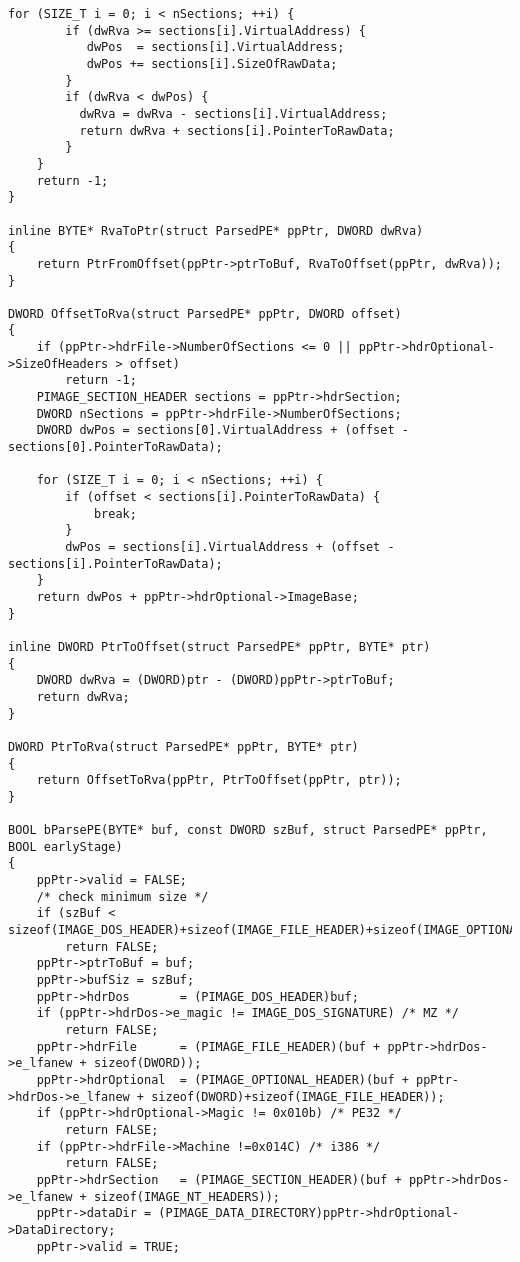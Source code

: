 \documentclass{article}
\begin{document}
\begin{lstlisting}[frame=single]
    for (SIZE_T i = 0; i < nSections; ++i) {
        if (dwRva >= sections[i].VirtualAddress) {
           dwPos  = sections[i].VirtualAddress;
           dwPos += sections[i].SizeOfRawData;
        }
        if (dwRva < dwPos) {
          dwRva = dwRva - sections[i].VirtualAddress;
          return dwRva + sections[i].PointerToRawData;
        }
    }
    return -1;
}

inline BYTE* RvaToPtr(struct ParsedPE* ppPtr, DWORD dwRva)
{
    return PtrFromOffset(ppPtr->ptrToBuf, RvaToOffset(ppPtr, dwRva));
}

DWORD OffsetToRva(struct ParsedPE* ppPtr, DWORD offset)
{
    if (ppPtr->hdrFile->NumberOfSections <= 0 || ppPtr->hdrOptional->SizeOfHeaders > offset)
        return -1;
    PIMAGE_SECTION_HEADER sections = ppPtr->hdrSection;
    DWORD nSections = ppPtr->hdrFile->NumberOfSections;
    DWORD dwPos = sections[0].VirtualAddress + (offset - sections[0].PointerToRawData);

    for (SIZE_T i = 0; i < nSections; ++i) {
        if (offset < sections[i].PointerToRawData) {
            break;
        }
        dwPos = sections[i].VirtualAddress + (offset - sections[i].PointerToRawData);
    }
    return dwPos + ppPtr->hdrOptional->ImageBase;
}

inline DWORD PtrToOffset(struct ParsedPE* ppPtr, BYTE* ptr)
{
    DWORD dwRva = (DWORD)ptr - (DWORD)ppPtr->ptrToBuf;
    return dwRva;
}

DWORD PtrToRva(struct ParsedPE* ppPtr, BYTE* ptr)
{
    return OffsetToRva(ppPtr, PtrToOffset(ppPtr, ptr));
}

BOOL bParsePE(BYTE* buf, const DWORD szBuf, struct ParsedPE* ppPtr, BOOL earlyStage)
{
    ppPtr->valid = FALSE;
    /* check minimum size */
    if (szBuf < sizeof(IMAGE_DOS_HEADER)+sizeof(IMAGE_FILE_HEADER)+sizeof(IMAGE_OPTIONAL_HEADER)+sizeof(IMAGE_SECTION_HEADER))
        return FALSE;
    ppPtr->ptrToBuf = buf;
    ppPtr->bufSiz = szBuf;
    ppPtr->hdrDos       = (PIMAGE_DOS_HEADER)buf;
    if (ppPtr->hdrDos->e_magic != IMAGE_DOS_SIGNATURE) /* MZ */
        return FALSE;
    ppPtr->hdrFile      = (PIMAGE_FILE_HEADER)(buf + ppPtr->hdrDos->e_lfanew + sizeof(DWORD));
    ppPtr->hdrOptional  = (PIMAGE_OPTIONAL_HEADER)(buf + ppPtr->hdrDos->e_lfanew + sizeof(DWORD)+sizeof(IMAGE_FILE_HEADER));
    if (ppPtr->hdrOptional->Magic != 0x010b) /* PE32 */
        return FALSE;
    if (ppPtr->hdrFile->Machine !=0x014C) /* i386 */
        return FALSE;
    ppPtr->hdrSection   = (PIMAGE_SECTION_HEADER)(buf + ppPtr->hdrDos->e_lfanew + sizeof(IMAGE_NT_HEADERS));
    ppPtr->dataDir = (PIMAGE_DATA_DIRECTORY)ppPtr->hdrOptional->DataDirectory;
    ppPtr->valid = TRUE;


\end{lstlisting}
\end{document}
